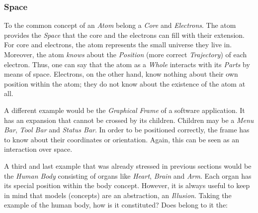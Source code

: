 %
%
%
%
%
%
%

\subsubsection{Space}
\label{space_heading}

To the common concept of an \emph{Atom} belong a \emph{Core} and \emph{Electrons}.
The atom provides the \emph{Space} that the core and the electrons can fill with
their extension. For core and electrons, the atom represents the small universe
they live in. Moreover, the atom \emph{knows} about the \emph{Position} (more
correct \emph{Trajectory}) of each electron. Thus, one can say that the atom as
a \emph{Whole} interacts with its \emph{Parts} by means of space. Electrons, on
the other hand, know nothing about their own position within the atom; they do
not know about the existence of the atom at all.

A different example would be the \emph{Graphical Frame} of a software application.
It has an expansion that cannot be crossed by its children. Children may be a
\emph{Menu Bar}, \emph{Tool Bar} and \emph{Status Bar}. In order to be positioned
correctly, the frame has to know about their coordinates or orientation. Again,
this can be seen as an interaction over space.

A third and last example that was already stressed in previous sections would be
the \emph{Human Body} consisting of organs like \emph{Heart}, \emph{Brain} and
\emph{Arm}. Each organ has its special position within the body concept.
However, it is always useful to keep in mind that models (concepts) are an
abstraction, an \emph{Illusion}. Taking the example of the human body, how is
it constituted? Does belong to it the:

